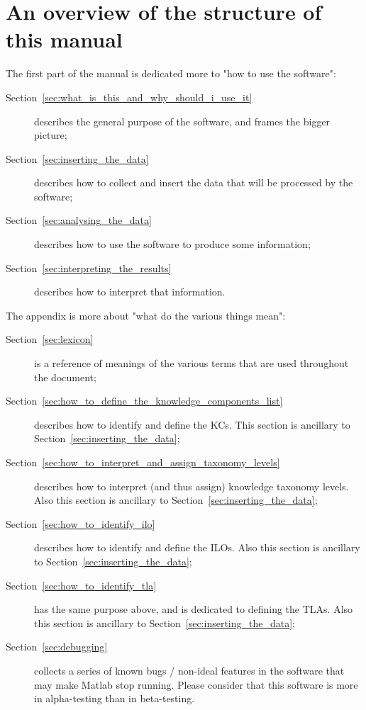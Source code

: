 \section{An overview of the structure of this manual}
\label{sec:an_overview_of_the_structure_of_this_manual}

The first part of the manual is dedicated more to "how to use the software":

\begin{description}

\item[Section~\ref{sec:what_is_this_and_why_should_i_use_it}] describes the general purpose of the software, and frames the bigger picture;

\item[Section~\ref{sec:inserting_the_data}] describes how to collect and insert the data that will be processed by the software;

\item[Section~\ref{sec:analysing_the_data}] describes how to use the software to produce some information;

\item[Section~\ref{sec:interpreting_the_results}] describes how to interpret that information.

\end{description}


The appendix is more about "what do the various things mean":

\begin{description}

\item[Section~\ref{sec:lexicon}] is a reference of meanings of the various terms that are used throughout the document; 

\item[Section~\ref{sec:how_to_define_the_knowledge_components_list}] describes how to identify and define the \acp{KC}. This section is ancillary to Section~\ref{sec:inserting_the_data};

\item[Section~\ref{sec:how_to_interpret_and_assign_taxonomy_levels}] describes how to interpret (and thus assign) knowledge taxonomy levels. Also this section is ancillary to Section~\ref{sec:inserting_the_data};

\item[Section~\ref{sec:how_to_identify_ilo}] describes how to identify and define the \acp{ILO}. Also this section is ancillary to Section~\ref{sec:inserting_the_data};

\item[Section~\ref{sec:how_to_identify_tla}] has the same purpose above, and is dedicated to defining the \acp{TLA}. Also this section is ancillary to Section~\ref{sec:inserting_the_data};

\item[Section~\ref{sec:debugging}] collects a series of known bugs / non-ideal features in the software that may make Matlab stop running. Please consider that this software is more in alpha-testing than in beta-testing.

\end{description}

